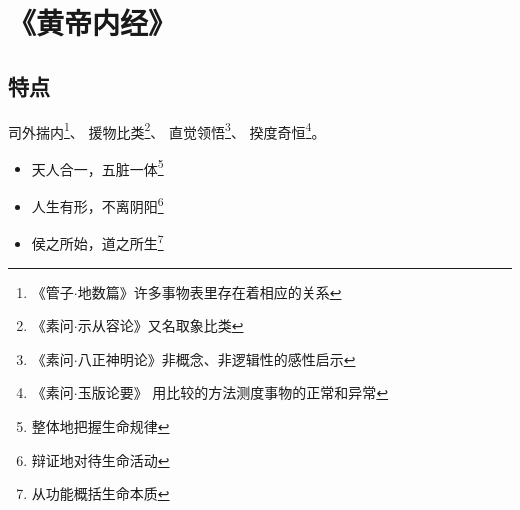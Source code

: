 \chapter{《黄帝内经》}

\section{特点}
司外揣内\footnote{《管子$\cdot$地数篇》许多事物表里存在着相应的关系}、
援物比类\footnote{《素问$\cdot$示从容论》又名取象比类}、
直觉领悟\footnote{《素问$\cdot$八正神明论》非概念、非逻辑性的感性启示}、
揆度奇恒\footnote{《素问$\cdot$玉版论要》 用比较的方法测度事物的正常和异常}。

\begin{itemize}
  \item 天人合一，五脏一体\footnote{整体地把握生命规律}
  \item 人生有形，不离阴阳\footnote{辩证地对待生命活动}
  \item 侯之所始，道之所生\footnote{从功能概括生命本质}
\end{itemize}
